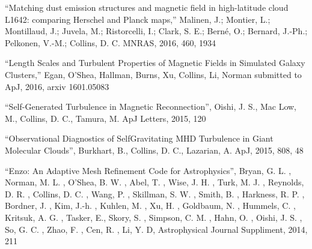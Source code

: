 \medskip
\noindent
``Matching dust emission structures and magnetic field in high-latitude cloud L1642: comparing Herschel and Planck maps,''
Malinen, J.; Montier, L.; Montillaud, J.; Juvela, M.; Ristorcelli, I.; Clark, S.  E.; Bern\'e, O.; Bernard, J.-Ph.; Pelkonen, V.-M.; Collins, D. C. 
MNRAS, 2016, 460, 1934


\medskip
\noindent
``Length Scales and Turbulent Properties of Magnetic Fields in Simulated Galaxy Clusters,'' 
Egan, O’Shea, Hallman, Burns, Xu, Collins, Li, Norman  
submitted to ApJ, 2016, arxiv 1601.05083

\medskip
\noindent
``Self-Generated Turbulence in Magnetic Reconnection'', 
Oishi, J. S., Mac Low, M., Collins, D. C., Tamura, M.  
ApJ Letters, 2015, 120

\medskip
\noindent
``Observational Diagnostics of Self­Gravitating MHD Turbulence in Giant Molecular Clouds'', 
Burkhart, B., Collins, D.  C., Lazarian, A.
ApJ,  2015, 808, 48

\medskip
\noindent
``Enzo: An Adaptive Mesh Refinement Code for Astrophysics'', 
Bryan, G. L. , Norman, M. L. , O'Shea, B. W. , Abel, T. , Wise, J. H. , Turk, M. J. , Reynolds, D. R. , Collins, D. C. , Wang, P. , Skillman, S. W. , Smith, B. , Harkness, R. P. , Bordner, J. , Kim, J.-h. , Kuhlen, M. , Xu, H. , Goldbaum, N. , Hummels, C. , Kritsuk, A. G. , Tasker, E., Skory, S. , Simpson, C. M. , Hahn, O. , Oishi, J. S. , So, G. C. , Zhao, F. , Cen, R. , Li, Y. D,
Astrophysical Journal Suppliment, 2014, 211

